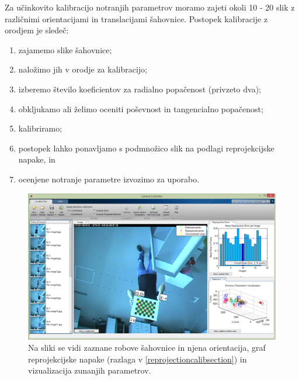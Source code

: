 \documentclass[a4paper, 12pt]{book}
\begin{document}
Za učinkovito kalibracijo notranjih parametrov moramo zajeti okoli 10 - 20 slik z različnimi orientacijami in translacijami šahovnice. Postopek kalibracije z orodjem je sledeč:
\begin{enumerate}
\itemsep0em
\item zajamemo slike šahovnice;
\item naložimo jih v orodje za kalibracijo;
\item izberemo število koeficientov za radialno popačenost (privzeto dva);
\item obkljukamo ali želimo oceniti poševnost in tangencialno popačenost;
\item kalibriramo;
\item postopek lahko ponavljamo s podmnožico slik na podlagi reprojekcijske napake, in
\item ocenjene notranje parametre izvozimo za uporabo.

\end{enumerate}
\begin{figure}[H]
\centering
\includegraphics[width=\textwidth,height=\textheight,keepaspectratio]{internal_calibration.png}
\caption{Na sliki se vidi zaznane robove šahovnice in njena orientacija, graf reprojekcijske napake (razlaga v \ref{reprojectioncalibsection}) in vizualizacija zunanjih parametrov.}
\end{figure}
\end{document}
